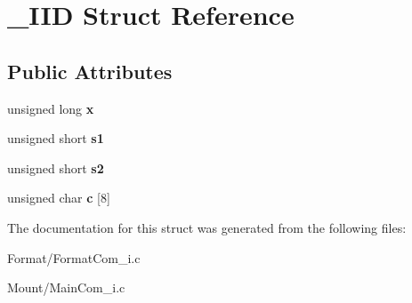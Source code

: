 \hypertarget{struct___i_i_d}{}\section{\+\_\+\+I\+ID Struct Reference}
\label{struct___i_i_d}
\subsection*{Public Attributes}
\begin{DoxyCompactItemize}
\item 
\mbox{\label{struct___i_i_d_add28d3db785dd98f1178f7ea88f5495c}} 
unsigned long {\bfseries x}
\item 
\mbox{\label{struct___i_i_d_a23024837c1b267b2fe58b64d57b509da}} 
unsigned short {\bfseries s1}
\item 
\mbox{\label{struct___i_i_d_afbdacab5216098be663859a1d2764de7}} 
unsigned short {\bfseries s2}
\item 
\mbox{\label{struct___i_i_d_aa13b8da4d66ea5f5af6e66f173768b13}} 
unsigned char {\bfseries c} \mbox{[}8\mbox{]}
\end{DoxyCompactItemize}


The documentation for this struct was generated from the following files\+:\begin{DoxyCompactItemize}
\item 
Format/Format\+Com\+\_\+i.\+c\item 
Mount/Main\+Com\+\_\+i.\+c\end{DoxyCompactItemize}
